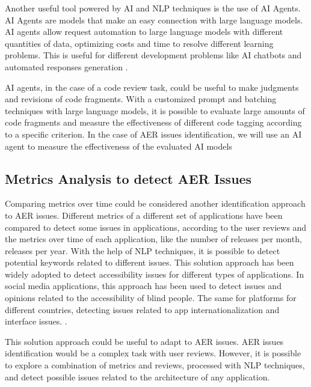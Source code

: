 Another useful tool powered by AI and NLP techniques is the use of AI Agents. AI Agents are models that make an easy connection with large language models. AI agents allow request automation to large language models with different quantities of data, optimizing costs and time to resolve different learning problems. This is useful for different development problems like AI chatbots and automated responses generation \citet{AI_agents_reference}.

AI agents, in the case of a code review task, could be useful to make judgments and revisions of code fragments. With a customized prompt and batching techniques with large language models, it is possible to evaluate large amounts of code fragments and measure the effectiveness of different code tagging according to a specific criterion. In the case of AER issues identification, we will use an AI agent to measure the effectiveness of the evaluated AI models


\subsection{Metrics Analysis to detect AER Issues}
Comparing metrics over time could be considered another identification approach to AER issues. Different metrics of a different set of applications have been compared to detect some issues in applications, according to the user reviews and the metrics over time of each application, like the number of releases per month, releases per year. With the help of NLP techniques, it is possible to detect potential keywords related to different issues. This solution approach has been widely adopted to detect accessibility issues for different types of applications. In social media applications, this approach has been used to detect issues and opinions related to the accessibility of blind people. The same for platforms for different countries, detecting issues related to app internationalization and interface issues.  \citet{accesibility_issues_metrics_tatiana}.

This solution approach could be useful to adapt to AER issues. AER issues identification would be a complex task with user reviews. However, it is possible to explore a combination of metrics and reviews, processed with NLP techniques, and detect possible issues related to the architecture of any application.









